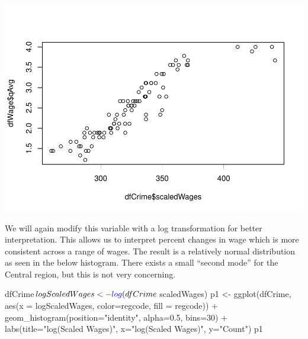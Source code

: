 \documentclass[]{article}
\newenvironment{Shaded}{}{}
\newcommand{\DataTypeTok}[1]{#1}
\newcommand{\DecValTok}[1]{#1}
\newcommand{\FloatTok}[1]{#1}
\newcommand{\KeywordTok}[1]{\textcolor[rgb]{0.00,0.00,1.00}{#1}}
\newcommand{\NormalTok}[1]{#1}
\newcommand{\OperatorTok}[1]{#1}
\newcommand{\StringTok}[1]{\textcolor[rgb]{0.00,0.50,0.50}{#1}}
\begin{document}
\includegraphics{Bagnard_Gaustad_Hartman_Leung_Lab_3_files/figure-latex/unnamed-chunk-55-1.pdf}

We will again modify this variable with a log transformation for better
interpretation. This allows us to interpret percent changes in wage
which is more consistent across a range of wages. The result is a
relatively normal distribution as seen in the below histogram. There
exists a small ``second mode'' for the Central region, but this is not
very concerning.

\begin{Shaded}
\begin{Highlighting}[]
\NormalTok{dfCrime}\OperatorTok{$}\NormalTok{logScaledWages <-}\StringTok{ }\KeywordTok{log}\NormalTok{(dfCrime}\OperatorTok{$}\NormalTok{scaledWages)}
\NormalTok{p1 <-}\StringTok{ }\KeywordTok{ggplot}\NormalTok{(dfCrime, }\KeywordTok{aes}\NormalTok{(}\DataTypeTok{x =}\NormalTok{ logScaledWages, }\DataTypeTok{color=}\NormalTok{regcode, }\DataTypeTok{fill =}\NormalTok{ regcode)) }\OperatorTok{+}
\StringTok{  }\KeywordTok{geom_histogram}\NormalTok{(}\DataTypeTok{position=}\StringTok{"identity"}\NormalTok{, }\DataTypeTok{alpha=}\FloatTok{0.5}\NormalTok{, }\DataTypeTok{bins=}\DecValTok{30}\NormalTok{) }\OperatorTok{+}
\StringTok{  }\KeywordTok{labs}\NormalTok{(}\DataTypeTok{title=}\StringTok{"log(Scaled Wages)"}\NormalTok{, }\DataTypeTok{x=}\StringTok{"log(Scaled Wages)"}\NormalTok{, }\DataTypeTok{y=}\StringTok{"Count"}\NormalTok{)}
\NormalTok{p1}
\end{Highlighting}
\end{Shaded}
\end{document}

